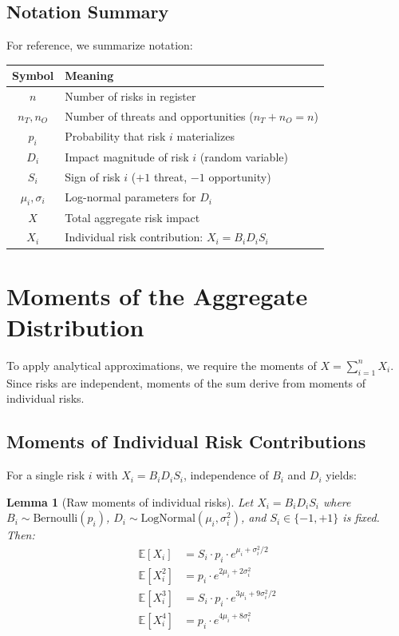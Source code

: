 \documentclass[12pt,a4paper]{article}
\newtheorem{lemma}[theorem]{Lemma}
\theoremstyle{definition}
\theoremstyle{remark}
\newcommand{\E}{\mathbb{E}}
\begin{document}
\subsection{Notation Summary}

For reference, we summarize notation:
\begin{center}
\begin{tabular}{cl}
\toprule
Symbol & Meaning \\
\midrule
$n$ & Number of risks in register \\
$n_T, n_O$ & Number of threats and opportunities ($n_T + n_O = n$) \\
$p_i$ & Probability that risk $i$ materializes \\
$D_i$ & Impact magnitude of risk $i$ (random variable) \\
$S_i$ & Sign of risk $i$ ($+1$ threat, $-1$ opportunity) \\
$\mu_i, \sigma_i$ & Log-normal parameters for $D_i$ \\
$X$ & Total aggregate risk impact \\
$X_i$ & Individual risk contribution: $X_i = B_i D_i S_i$ \\
\bottomrule
\end{tabular}
\end{center}

\section{Moments of the Aggregate Distribution}
\label{sec:moments}

To apply analytical approximations, we require the moments of $X = \sum_{i=1}^n X_i$. Since risks are independent, moments of the sum derive from moments of individual risks.

\subsection{Moments of Individual Risk Contributions}

For a single risk $i$ with $X_i = B_i D_i S_i$, independence of $B_i$ and $D_i$ yields:

\begin{lemma}[Raw moments of individual risks]
\label{lem:individual_moments}
Let $X_i = B_i D_i S_i$ where $B_i \sim \text{Bernoulli}(p_i)$, $D_i \sim \text{LogNormal}(\mu_i, \sigma_i^2)$, and $S_i \in \{-1, +1\}$ is fixed. Then:
\begin{align}
    \E[X_i] &= S_i \cdot p_i \cdot e^{\mu_i + \sigma_i^2/2} \\
    \E[X_i^2] &= p_i \cdot e^{2\mu_i + 2\sigma_i^2} \\
    \E[X_i^3] &= S_i \cdot p_i \cdot e^{3\mu_i + 9\sigma_i^2/2} \\
    \E[X_i^4] &= p_i \cdot e^{4\mu_i + 8\sigma_i^2}
\end{align}
\end{lemma}
\end{document}
